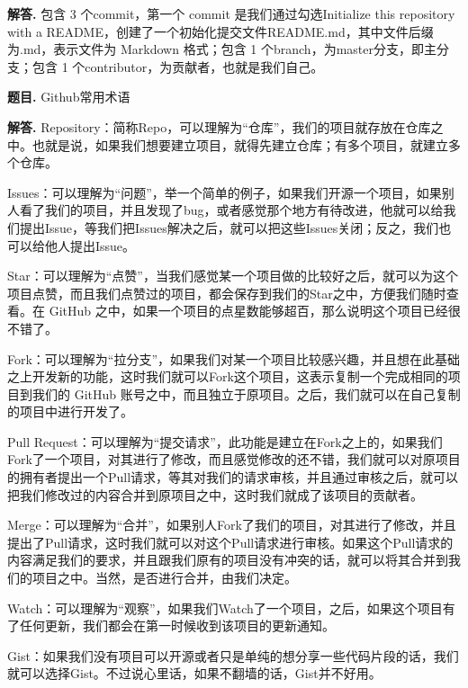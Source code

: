 \documentclass[12pt, a4paper, oneside]{ctexart}
\newcounter{problemname}
\newenvironment{problem}{\stepcounter{problemname}\par\noindent\textbf{题目\arabic{problemname}. }}{\\\par}
\newenvironment{solution}{\par\noindent\textbf{解答. }}{\\\par}
\begin{document}
\begin{solution}
    包含 3 个commit，第一个 commit 是我们通过勾选Initialize this repository with a README，创建了一个初始化提交文件README.md，其中文件后缀为.md，表示文件为 Markdown 格式；包含 1 个branch，为master分支，即主分支；包含 1 个contributor，为贡献者，也就是我们自己。
\end{solution}

\begin{problem}
    Github常用术语
\end{problem}

\begin{solution}
    Repository：简称Repo，可以理解为“仓库”，我们的项目就存放在仓库之中。也就是说，如果我们想要建立项目，就得先建立仓库；有多个项目，就建立多个仓库。
    
    Issues：可以理解为“问题”，举一个简单的例子，如果我们开源一个项目，如果别人看了我们的项目，并且发现了bug，或者感觉那个地方有待改进，他就可以给我们提出Issue，等我们把Issues解决之后，就可以把这些Issues关闭；反之，我们也可以给他人提出Issue。
    
    Star：可以理解为“点赞”，当我们感觉某一个项目做的比较好之后，就可以为这个项目点赞，而且我们点赞过的项目，都会保存到我们的Star之中，方便我们随时查看。在 GitHub 之中，如果一个项目的点星数能够超百，那么说明这个项目已经很不错了。

Fork：可以理解为“拉分支”，如果我们对某一个项目比较感兴趣，并且想在此基础之上开发新的功能，这时我们就可以Fork这个项目，这表示复制一个完成相同的项目到我们的 GitHub 账号之中，而且独立于原项目。之后，我们就可以在自己复制的项目中进行开发了。

Pull Request：可以理解为“提交请求”，此功能是建立在Fork之上的，如果我们Fork了一个项目，对其进行了修改，而且感觉修改的还不错，我们就可以对原项目的拥有者提出一个Pull请求，等其对我们的请求审核，并且通过审核之后，就可以把我们修改过的内容合并到原项目之中，这时我们就成了该项目的贡献者。

Merge：可以理解为“合并”，如果别人Fork了我们的项目，对其进行了修改，并且提出了Pull请求，这时我们就可以对这个Pull请求进行审核。如果这个Pull请求的内容满足我们的要求，并且跟我们原有的项目没有冲突的话，就可以将其合并到我们的项目之中。当然，是否进行合并，由我们决定。

Watch：可以理解为“观察”，如果我们Watch了一个项目，之后，如果这个项目有了任何更新，我们都会在第一时候收到该项目的更新通知。

Gist：如果我们没有项目可以开源或者只是单纯的想分享一些代码片段的话，我们就可以选择Gist。不过说心里话，如果不翻墙的话，Gist并不好用。
\end{solution}
\end{document}
